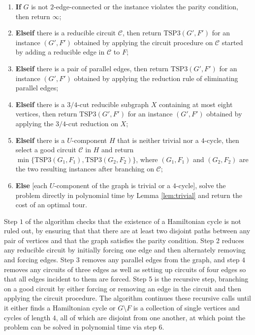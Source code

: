 \begin{enumerate}
\item {\bf If} $G$ is not $2$-edge-connected or the instance violates the parity condition, then return $\infty$;
\item {\bf Elseif} there is a reducible circuit $\mathcal{C}$, then return $\text{TSP3}(G', F')$ for an instance $(G',F')$ obtained by applying the circuit procedure on $\mathcal{C}$ started by adding a reducible edge in $\mathcal{C}$ to $F$;
\item {\bf Elseif} there is a pair of parallel edges, then return $\text{TSP3}(G',F')$ for an instance $(G',F')$ obtained by applying the reduction rule of eliminating parallel edges;
\item {\bf Elseif} there is a $3/4$-cut reducible subgraph $X$ containing at most eight vertices, then return $\text{TSP3}(G',F')$ for an instance $(G',F')$ obtained by applying the $3/4$-cut reduction on $X$;
\item {\bf Elseif} there is a $U$-component $H$ that is neither trivial nor a $4$-cycle, then select a good circuit $\mathcal{C}$ in $H$ and return $\min\{\text{TSP3}(G_1,F_1), \text{TSP3}(G_2,F_2)\}$, where $(G_1,F_1)$ and $(G_2,F_2)$ are the
two resulting instances after branching on $\mathcal{C}$;
\item {\bf Else} [each $U$-component of the graph is trivial or a $4$-cycle], solve the problem directly in polynomial time by Lemma \ref{lem:trivial} and return the cost of an optimal tour.
\end{enumerate}

Step $1$ of the algorithm checks that the existence of a Hamiltonian cycle is not ruled out, by ensuring that that there are at least two disjoint paths between any pair of vertices and that the graph satisfies the parity condition. Step 2 reduces any reducible circuit by initially forcing one edge and then alternately removing and forcing edges. Step $3$ removes any parallel edges from the graph, and step $4$ removes any circuits of three edges as well as setting up circuits of four edges so that all edges incident to them are forced. Step 5 is the recursive step, branching on a good circuit by either forcing or removing an edge in the circuit and then applying the circuit procedure. The algorithm continues these recursive calls until it either finds a Hamiltonian cycle or $G \setminus F$ is a collection of single vertices and cycles of length $4$, all of which are disjoint from one another, at which point the problem can be solved in polynomial time via step $6$.

